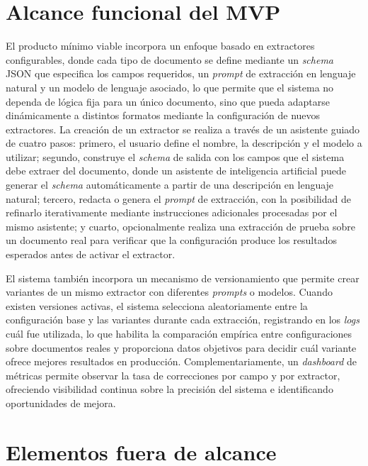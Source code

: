 \section{Alcance funcional del MVP}

El producto mínimo viable incorpora un enfoque basado en extractores configurables, donde cada tipo de documento se define mediante un \textit{schema} JSON que especifica los campos requeridos, un \textit{prompt} de extracción en lenguaje natural y un modelo de lenguaje asociado, lo que permite que el sistema no dependa de lógica fija para un único documento, sino que pueda adaptarse dinámicamente a distintos formatos mediante la configuración de nuevos extractores. La creación de un extractor se realiza a través de un asistente guiado de cuatro pasos: primero, el usuario define el nombre, la descripción y el modelo a utilizar; segundo, construye el \textit{schema} de salida con los campos que el sistema debe extraer del documento, donde un asistente de inteligencia artificial puede generar el \textit{schema} automáticamente a partir de una descripción en lenguaje natural; tercero, redacta o genera el \textit{prompt} de extracción, con la posibilidad de refinarlo iterativamente mediante instrucciones adicionales procesadas por el mismo asistente; y cuarto, opcionalmente realiza una extracción de prueba sobre un documento real para verificar que la configuración produce los resultados esperados antes de activar el extractor.

El sistema también incorpora un mecanismo de versionamiento que permite crear variantes de un mismo extractor con diferentes \textit{prompts} o modelos. Cuando existen versiones activas, el sistema selecciona aleatoriamente entre la configuración base y las variantes durante cada extracción, registrando en los \textit{logs} cuál fue utilizada, lo que habilita la comparación empírica entre configuraciones sobre documentos reales y proporciona datos objetivos para decidir cuál variante ofrece mejores resultados en producción. Complementariamente, un \textit{dashboard} de métricas permite observar la tasa de correcciones por campo y por extractor, ofreciendo visibilidad continua sobre la precisión del sistema e identificando oportunidades de mejora.

\section{Elementos fuera de alcance}

